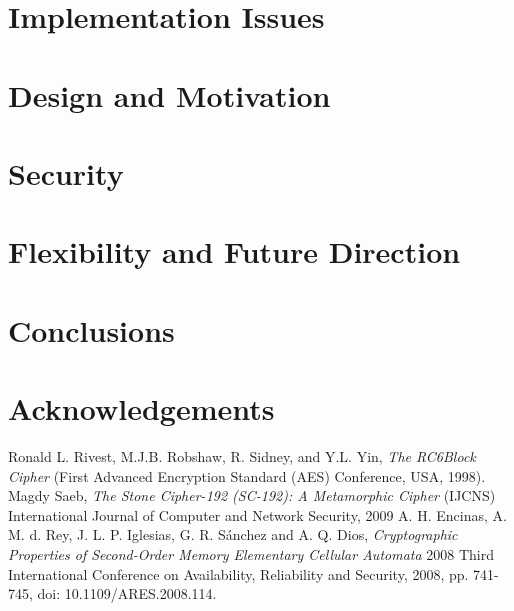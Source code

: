 \documentclass{article}
\begin{document}
\section{Implementation Issues}

\section{Design and Motivation}

\section{Security}

\section{Flexibility and Future Direction}

\section{Conclusions}

\section{Acknowledgements}

\begin{thebibliography}{unsrt}
  Ronald L. Rivest, M.J.B. Robshaw, R. Sidney, and Y.L. Yin, \emph{The RC6\texttrademark Block Cipher} (First Advanced Encryption Standard (AES) Conference, USA, 1998).
  Magdy Saeb, \emph{The Stone Cipher-192 (SC-192): A Metamorphic Cipher} (IJCNS) International Journal of Computer and Network Security, 2009
  A. H. Encinas, A. M. d. Rey, J. L. P. Iglesias, G. R. Sánchez and A. Q. Dios, \emph{Cryptographic Properties of Second-Order Memory Elementary Cellular Automata} 2008 Third International Conference on Availability, Reliability and Security, 2008, pp. 741-745, doi: 10.1109/ARES.2008.114.
\end{thebibliography}
\end{document}
